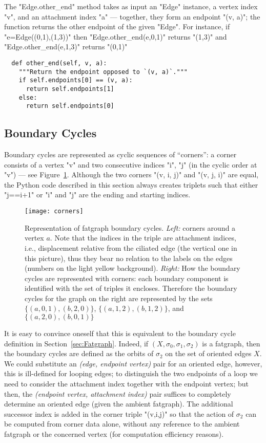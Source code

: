 The "Edge.other_end" method takes as input an "Edge" instance, a
vertex index "v", and an attachment index "a" --- together, they
form an endpoint "(v, a)"; the function returns the other endpoint
of the given "Edge".  For instance, if "e=Edge((0,1),(1,3))"
then "Edge.other_end(e,0,1)" returns "(1,3)" and
"Edge.other_end(e,1,3)" returns "(0,1)"
\begin{lstlisting}
  def other_end(self, v, a):
    """Return the endpoint opposed to `(v, a)`."""
    if self.endpoints[0] == (v, a):
      return self.endpoints[1]
    else:
      return self.endpoints[0]

\end{lstlisting}


\subsection{Boundary Cycles}
\label{sec:boundary-cycles}

Boundary cycles are represented as cyclic sequences of ``corners'': a
corner consists of a vertex "v" and two consecutive indices "i", "j"
(in the cyclic order at "v") --- see Figure~\ref{fig:corners}. 
Although the two corners "(v, i, j)" and "(v, j, i)" are equal, the
Python code described in this section always creates triplets such that
either "j==i+1" or "i" and "j" are the ending and starting indices.
\begin{figure}
  \centering
  \texttt{[image: corners]}
  \caption{Representation of fatgraph boundary cycles. \emph{Left:}
    corners around a vertex $a$. Note that the indices in the triple
    are attachment indices, i.e., displacement relative from the
    ciliated edge (the vertical one in this picture), thus they bear
    no relation to the labels on the edges (numbers on the light
    yellow background). \emph{Right:} How the boundary cycles are
    represented with corners: each boundary component is identified
    with the set of triples it encloses. Therefore the boundary cycles
    for the graph on the right are represented by the sets $\{(a,0,1),
    (b,2,0)\}$, $\{(a,1,2), (b,1,2)\}$, and $\{(a,2,0), (b,0,1)\}$}
  \label{fig:corners}
\end{figure}
It is easy to convince oneself that this is equivalent to the boundary
cycle definition in Section~\ref{sec:Fatgraph}.  Indeed, if $(X, \sigma_0,
\sigma_1, \sigma_2)$ is a fatgraph, then the boundary cycles are
defined as the orbits of $\sigma_2$ on the set of oriented edges
$X$. We could substitute an \emph{(edge, endpoint vertex)} pair for an
oriented edge, however, this is ill-defined for looping edges; to
distinguish the two endpoints of a loop we need to consider the
attachment index together with the endpoint vertex; but then, the
\emph{(endpoint vertex, attachment index)} pair suffices to completely
determine an oriented edge (given the ambient fatgraph).  The
additional successor index is added in the corner triple "(v,i,j)"
so that the action of $\sigma_2$ can be computed from corner data
alone, without any reference to the ambient fatgraph or the concerned
vertex (for computation efficiency reasons).

